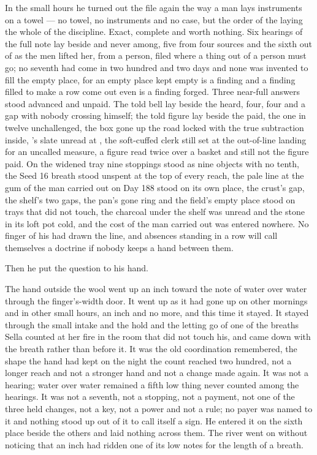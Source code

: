 In the small hours he turned out the file again the way a man lays instruments on a towel --- no towel, no instruments and no case, but the order of the laying the whole of the discipline. Exact, complete and worth nothing. Six hearings of the full note lay beside and never among, five from four sources and the sixth out of  as the men lifted her, from a person, filed where a thing out of a person must go; no seventh had come in two hundred and two days and none was invented to fill the empty place, for an empty place kept empty is a finding and a finding filled to make a row come out even is a finding forged. Three near-full answers stood advanced and unpaid. The told bell lay beside the heard, four, four and a gap with nobody crossing himself; the told figure lay beside the paid, the one in twelve unchallenged, the box gone up the road locked with the true subtraction inside, 's slate unread at , the soft-cuffed clerk still set at the out-of-line landing for an uncalled measure, a figure read twice over a basket and still not the figure paid. On the widened tray nine stoppings stood as nine objects with no tenth, the Seed 16 breath stood unspent at the top of every reach, the pale line at the gum of the man carried out on Day 188 stood on its own place, the crust's gap, the shelf's two gaps, the pan's gone ring and the field's empty place stood on trays that did not touch, the charcoal under the shelf was unread and the stone in its loft pot cold, and the cost of the man carried out was entered nowhere. No finger of his had drawn the line, and absences standing in a row will call themselves a doctrine if nobody keeps a hand between them.

Then he put the question to his hand.

The hand outside the wool went up an inch toward the note of water over water through the finger's-width door. It went up as it had gone up on other mornings and in other small hours, an inch and no more, and this time it stayed. It stayed through the small intake and the hold and the letting go of one of the breaths Sella counted at her fire in the room that did not touch his, and came down with the breath rather than before it. It was the old coordination remembered, the shape the hand had kept on the night the count reached two hundred, not a longer reach and not a stronger hand and not a change made again. It was not a hearing; water over water remained a fifth low thing never counted among the hearings. It was not a seventh, not a stopping, not a payment, not one of the three held changes, not a key, not a power and not a rule; no payer was named to it and nothing stood up out of it to call itself a sign. He entered it on the sixth place beside the others and laid nothing across them. The river went on without noticing that an inch had ridden one of its low notes for the length of a breath.

